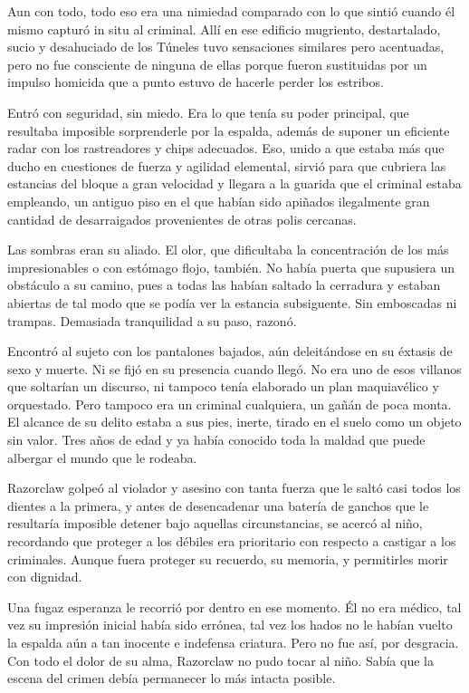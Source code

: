 Aun con todo, todo eso era una nimiedad comparado con lo que sintió cuando él mismo capturó in situ al criminal. Allí en ese edificio mugriento, destartalado, sucio y desahuciado de los Túneles tuvo sensaciones similares pero acentuadas, pero no fue consciente de ninguna de ellas porque fueron sustituidas por un impulso homicida que a punto estuvo de hacerle perder los estribos.

Entró con seguridad, sin miedo. Era lo que tenía su poder principal, que resultaba imposible sorprenderle por la espalda, además de suponer un eficiente radar con los rastreadores y chips adecuados. Eso, unido a que estaba más que ducho en cuestiones de fuerza y agilidad elemental, sirvió para que cubriera las estancias del bloque a gran velocidad y llegara a la guarida que el criminal estaba empleando, un antiguo piso en el que habían sido apiñados ilegalmente gran cantidad de desarraigados provenientes de otras polis cercanas.

Las sombras eran su aliado. El olor, que dificultaba la concentración de los más impresionables o con estómago flojo, también. No había puerta que supusiera un obstáculo a su camino, pues a todas las habían saltado la cerradura y estaban abiertas de tal modo que se podía ver la estancia subsiguente. Sin emboscadas ni trampas. Demasiada tranquilidad a su paso, razonó.

Encontró al sujeto con los pantalones bajados, aún deleitándose en su éxtasis de sexo y muerte. Ni se fijó en su presencia cuando llegó. No era uno de esos villanos que soltarían un discurso, ni tampoco tenía elaborado un plan maquiavélico y orquestado. Pero tampoco era un criminal cualquiera, un gañán de poca monta. El alcance de su delito estaba a sus pies, inerte, tirado en el suelo como un objeto sin valor. Tres años de edad y ya había conocido toda la maldad que puede albergar el mundo que le rodeaba.

Razorclaw golpeó al violador y asesino con tanta fuerza que le saltó casi todos los dientes a la primera, y antes de desencadenar una batería de ganchos que le resultaría imposible detener bajo aquellas circunstancias, se acercó al niño, recordando que proteger a los débiles era prioritario con respecto a castigar a los criminales. Aunque fuera proteger su recuerdo, su memoria, y permitirles morir con dignidad.

Una fugaz esperanza le recorrió por dentro en ese momento. Él no era médico, tal vez su impresión inicial había sido errónea, tal vez los hados no le habían vuelto la espalda aún a tan inocente e indefensa criatura. Pero no fue así, por desgracia. Con todo el dolor de su alma, Razorclaw no pudo tocar al niño. Sabía que la escena del crimen debía permanecer lo más intacta posible.

